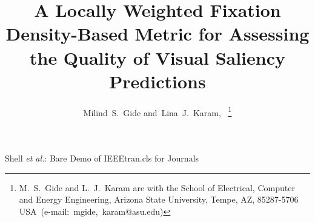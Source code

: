 \documentclass[12pt,onecolumn,journal,	draftclsnofoot]{IEEEtran}
\begin{document}
%
\title{A Locally Weighted Fixation Density-Based Metric for Assessing the Quality of Visual Saliency Predictions}
%
%
%

\author{Milind~S.~Gide       
        and~Lina~J.~Karam,~%
\thanks{M.~S.~Gide and L.~J.~Karam are with the School
	of Electrical, Computer and Energy Engineering, Arizona State University, Tempe, AZ, 85287-5706 USA~(e-mail:~mgide,~karam@asu.edu)}%
}

% 
%



%
{Shell \MakeLowercase{\textit{et al.}}: Bare Demo of IEEEtran.cls for Journals}
% 
\end{document}
